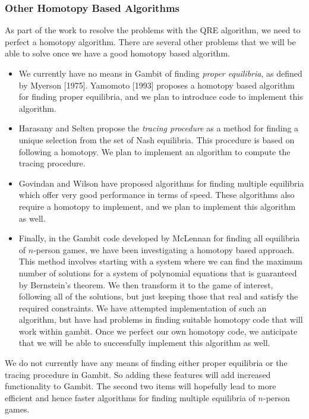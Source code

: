 \documentclass[12pt]{article}
\begin{document}
\subsubsection{Other Homotopy Based Algorithms}
As part of the work to resolve the problems with the QRE algorithm, we
need to perfect a homotopy algorithm.  There are several other
problems that we will be able to solve once we have a good homotopy
based algorithm.  

\begin{itemize} 
\item
We currently have no means in Gambit of finding {\it proper
equilibria}, as defined by Myerson [1975].  Yamomoto [1993] proposes a
homotopy based algorithm for finding proper equilibria, and we plan to
introduce code to implement this algorithm.
\item
Harasany and Selten propose the {\it tracing procedure} as a method
for finding a unique selection from the set of Nash equilibria.  This
procedure is based on following a homotopy.  We plan to implement an
algorithm to compute the tracing procedure.
\item
Govindan and Wilson have proposed algorithms for finding multiple
equilibria which offer very good performance in terms of speed.  These
algorithms also require a homotopy to implement, and we plan to
implement this algorithm as well.
\item
Finally, in the Gambit code developed by McLennan for finding all
equilibria of $n$-person games, we have been investigating a homotopy
based approach.  This method involves starting with a system where we
can find the maximum number of solutions for a system of polynomial
equations that is guaranteed by Bernstein's theorem.  We then
transform it to the game of interest, following all of the solutions,
but just keeping those that real and satisfy the required constraints.
We have attempted implementation of such an algorithm, but have had
problems in finding suitable homotopy code that will work within
gambit.  Once we perfect our own homotopy code, we anticipate that we
will be able to successfully implement this algorithm as well.
\end{itemize}

We do not currently have any means of finding either proper equilibria
or the tracing procedure in Gambit.  So adding these features will add
increased functionality to Gambit.  The second two items will
hopefully lead to more efficient and hence faster algorithms for
finding multiple equilibria of $n$-person games.
\end{document}
